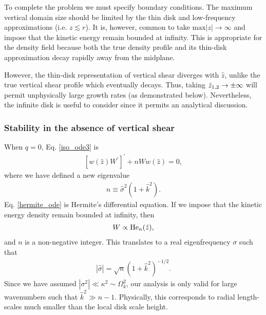 To complete the problem we must specify boundary conditions. The 
maximum vertical domain size should be limited by the thin
disk and low-frequency approximations (i.e. $z\lesssim r$).     
It is, however, common to take $\mathrm{max}|z|\to\infty$ and impose
that the kinetic  energy remain bounded at infinity. This 
is appropriate for the density field because both the true density profile 
and its thin-disk approximation decay rapidly away from the midplane.   

However, the thin-disk representation of vertical shear diverges with 
$\hat{z}$, unlike the true vertical shear profile which eventually
decays.  Thus, taking $\hat{z}_{1,2}\to \pm\infty$ will permit unphysically large growth
rates (as demonstrated below). Nevertheless, the infinite disk is
useful to consider since it permits an analytical discussion. 

\subsubsection{Stability in the absence of vertical shear}
When $q=0$, Eq. \ref{iso_ode3} is
\begin{align}\label{hermite_ode}
  \left[w(\hat{z})W^\prime \right]^\prime + nW
  w(\hat{z}) =0, 
\end{align}
where we have defined a new eigenvalue
\begin{align}
  n \equiv \hat{\sigma}^2(1+\hat{k}^2). 
\end{align} 
Eq. \ref{hermite_ode} is Hermite's differential equation. If we impose
that the kinetic energy density remain bounded at infinity, then  
\begin{align}
  W \propto \operatorname{He}_n(\hat{z}),
\end{align}
and $n$ is a non-negative integer. This translates to a real
eigenfrequency $\sigma$ such that
\begin{align}
  \left|\hat{\sigma}\right| = \sqrt{n}
  \left(1+\hat{k}^2\right)^{-1/2}. 
\end{align}
Since we have assumed $|\sigma^2|\ll \kappa^2\sim \Omega_k^2$, our
analysis is only valid for large wavenumbers such that $\hat{k}^2\gg   
n-1$. Physically, this corresponds to radial length-scales much
smaller than the local disk scale height. 

